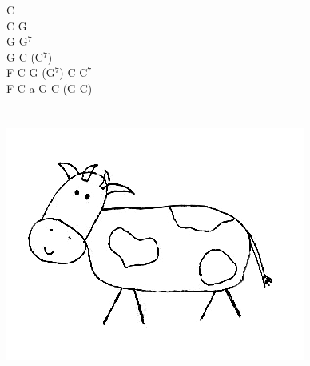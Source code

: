 \documentclass[a5paper, 10pt]{book}
\begin{document}
\begin{minipage}[t]{0.25\textwidth}
C\\
C G\\
G G$^7$\\
G C (C$^7$)\\

F C G (G$^7$) C C$^7$\\
F C a G C (G C)\\
\\
\\
\includegraphics[width=\textwidth, angle=-15]{images/justysia.png}\\
\end{minipage}

\newpage
\end{document}
